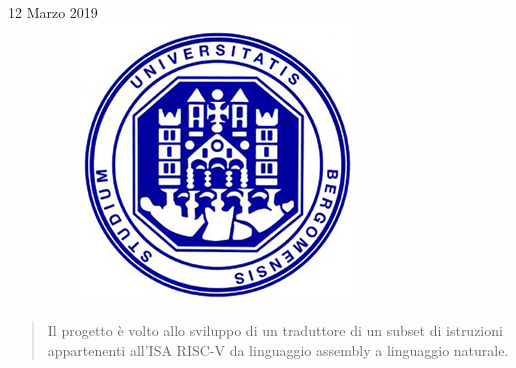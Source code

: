 \begin{titlepage}

{\large 12 Marzo 2019}\\[2cm] %


\includegraphics[scale=0.5]{logo.png}\\[1cm] %
 

\vfill %

\end{titlepage}


\begin{abstract}
Il progetto è volto allo sviluppo di un traduttore di un subset di istruzioni appartenenti all'ISA RISC-V da linguaggio assembly a linguaggio naturale.
\end{abstract}
